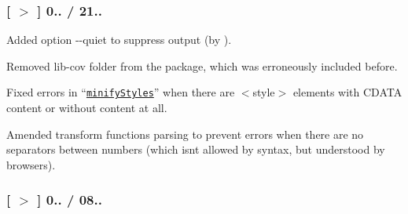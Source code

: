 \subsubsection*{\mbox{[} \href{https://github.com/svg/svgo/tree/v0.6.1}{\tt $>$} \mbox{]} 0.. / 21..}


\begin{DoxyItemize}
\item Added option {\ttfamily -\/-\/quiet} to suppress output (by ).
\item Removed {\ttfamily lib-\/cov} folder from the package, which was erroneously included before.
\item Fixed errors in “\href{https://github.com/svg/svgo/blob/master/plugins/minifyStyles.js}{\tt minify\+Styles}” when there are {\ttfamily $<$style$>$} elements with {\ttfamily C\+D\+A\+TA} content or without content at all.
\item Amended transform functions parsing to prevent errors when there are no separators between numbers (which isn\textquotesingle{}t allowed by syntax, but understood by browsers).
\end{DoxyItemize}

\subsubsection*{\mbox{[} \href{https://github.com/svg/svgo/tree/v0.6.0}{\tt $>$} \mbox{]} 0.. / 08..}


